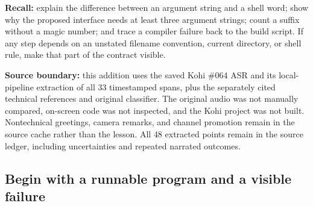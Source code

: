 \textbf{Recall:} explain the difference between an argument string and a shell word; show why the proposed interface needs at least three argument strings; count a suffix without a magic number; and trace a compiler failure back to the build script. If any step depends on an unstated filename convention, current directory, or shell rule, make that part of the contract visible.

\textbf{Source boundary:} this addition uses the saved Kohi \#064 ASR and its local-pipeline extraction of all 33 timestamped spans, plus the separately cited technical references and original classifier. The original audio was not manually compared, on-screen code was not inspected, and the Kohi project was not built. Nontechnical greetings, camera remarks, and channel promotion remain in the source cache rather than the lesson. All 48 extracted points remain in the source ledger, including uncertainties and repeated narrated outcomes.

\subsection{Begin with a runnable program and a visible failure}\label{05-engine-i-ch013-begin-with-a-runnable-program-and-a-visible-failure}

\hypertarget{05-engine-i-ch013-begin-with-a-runnable-program-and-a-visible-failure}{}

